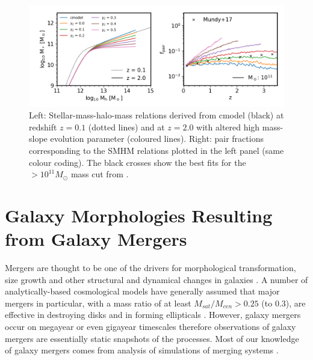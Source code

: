 \begin{figure}
	\centering
	\includegraphics[width = \linewidth]{Figures/Chapter5/PairFractionHMevo.png}
    \caption{Left: Stellar-mass-halo-mass relations derived from cmodel (black) at redshift $z = 0.1$ (dotted lines) and at $z = 2.0$ with altered high mass-slope evolution parameter (coloured lines). Right: pair fractions corresponding to the SMHM relations plotted in the left panel (same colour coding). The black crosses show the best fits for the $>10^{11}M_{\odot}$ mass cut from \citet{Mundy2017A3.5}.}
	\label{fig:PairFractionHMevo}
\end{figure}

\section{Galaxy Morphologies Resulting from Galaxy Mergers}

Mergers are thought to be one of the drivers for morphological transformation, size growth and other structural and dynamical changes in galaxies \citep{Bournaud2007, Hopkins2009TheDemographics, Hopkins2010MergersFunctions, Shankar2011SizeUniverse, Fontanot2015OnMergers}. A number of analytically-based cosmological models have generally assumed that major mergers in particular, with a mass ratio of at least $M_{sat}/M_{cen} > 0.25$ (to 0.3), are effective in destroying disks and in forming ellipticals \citep{Baugh2006AApproach, Malbon2007BlackFormation, Bower2010TheFormation}. However, galaxy mergers occur on megayear or even gigayear timescales therefore observations of galaxy mergers are essentially static snapshots of the processes. Most of our knowledge of galaxy mergers comes from analysis of simulations of merging systems \cite[e..g.][]{Hopkins2006ASpheroids,Hopkins2009TheDemographics, Hopkins2010MergersRate,Hopkins2009HOWMERGERS,Hopkins2010MERGERSMATTER,OLeary2020EMERGE:zsim6,Fensch2017High-redshiftFormation,Stewart2008MergerSurvival,Stewart2009GALAXYDEPENDENCE}. 

